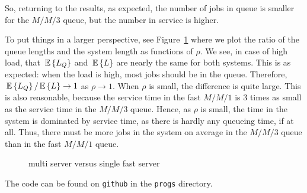 \begin{question}
\begin{solution}
So, returning to the results, as expected, the number of jobs in queue
is smaller for the $M/M/3$ queue, but the number in service is higher.

To put things in a larger perspective, see
Figure~\ref{fig:multisingle} where we plot the ratio of the queue
lengths and the system length as functions of $\rho$. We see, in case
of high load, that $\,\mathbb{E}\left\{L_Q\right\}$ and $\,\mathbb{E}\left\{L\right\}$ are nearly the same for both
systems. This is as expected: when the load is high, most jobs should
be in the queue. Therefore, $\,\mathbb{E}\left\{L_Q\right\}/\,\mathbb{E}\left\{L\right\} \to 1$ as $\rho\to 1$. When
$\rho$ is small, the difference is quite large. This is also
reasonable, because the service time in the fast $M/M/1$ is 3 times as
small as the service time in the $M/M/3$ queue. Hence, as $\rho$ is
small, the time in the system is dominated by service time, as there
is hardly any queueing time, if at all.  Thus, there must be more jobs
in the system on average in the $M/M/3$ queue than in the fast $M/M/1$
queue.

\begin{figure}[h]
  \centering

\caption{multi server versus single fast server}
  \label{fig:multisingle}
\end{figure}

The  code can be found on \texttt{github} in the \texttt{progs} directory.

\end{solution}
\end{question}


